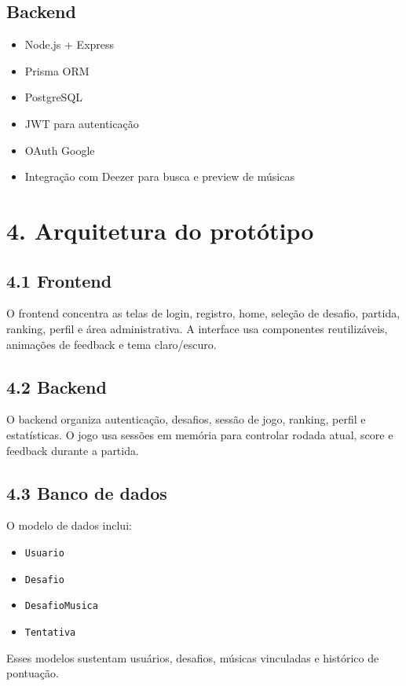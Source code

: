 \documentclass[12pt,a4paper]{article}
\begin{document}
\subsection*{Backend}
\begin{itemize}[leftmargin=1.2em]
  \item Node.js + Express
  \item Prisma ORM
  \item PostgreSQL
  \item JWT para autenticação
  \item OAuth Google
  \item Integração com Deezer para busca e preview de músicas
\end{itemize}

\section*{4. Arquitetura do protótipo}
\subsection*{4.1 Frontend}
O frontend concentra as telas de login, registro, home, seleção de desafio, partida, ranking, perfil e área administrativa. A interface usa componentes reutilizáveis, animações de feedback e tema claro/escuro.

\subsection*{4.2 Backend}
O backend organiza autenticação, desafios, sessão de jogo, ranking, perfil e estatísticas. O jogo usa sessões em memória para controlar rodada atual, score e feedback durante a partida.

\subsection*{4.3 Banco de dados}
O modelo de dados inclui:
\begin{itemize}[leftmargin=1.2em]
  \item \texttt{Usuario}
  \item \texttt{Desafio}
  \item \texttt{DesafioMusica}
  \item \texttt{Tentativa}
\end{itemize}

Esses modelos sustentam usuários, desafios, músicas vinculadas e histórico de pontuação.
\end{document}
